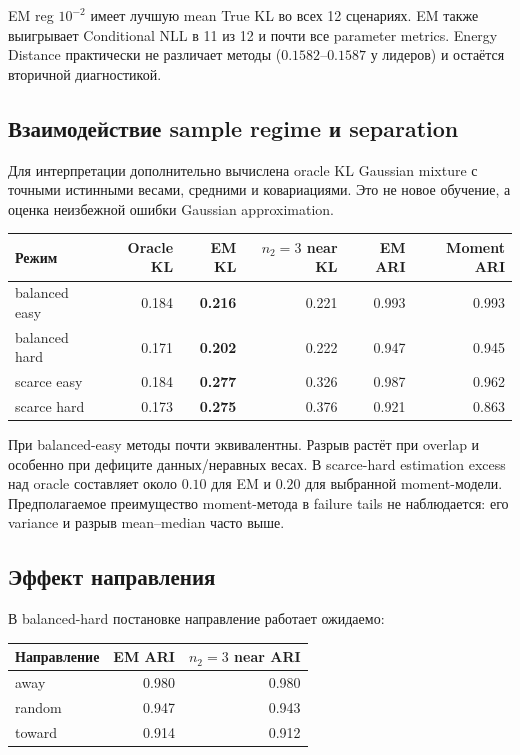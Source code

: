 \documentclass[11pt,a4paper]{article}
\newcommand{\best}[1]{\textbf{\color{green}#1}}
\begin{document}
EM reg $10^{-2}$ имеет лучшую mean True KL во всех 12 сценариях.
EM также выигрывает Conditional NLL в 11 из 12 и почти все parameter
metrics. Energy Distance практически не различает методы
($0.1582$--$0.1587$ у лидеров) и остаётся вторичной диагностикой.

\subsection{Взаимодействие sample regime и separation}

Для интерпретации дополнительно вычислена oracle KL Gaussian mixture с
точными истинными весами, средними и ковариациями. Это не новое обучение, а
оценка неизбежной ошибки Gaussian approximation.

\begin{center}
\small
\begin{tabular}{@{}lrrrrr@{}}
\toprule
\rowcolor{lightgray}
\textbf{Режим} & \textbf{Oracle KL} &
\textbf{EM KL} & \textbf{$n_2=3$ near KL} &
\textbf{EM ARI} & \textbf{Moment ARI}\\
\midrule
balanced easy & 0.184 & \best{0.216} & 0.221 & 0.993 & 0.993\\
balanced hard & 0.171 & \best{0.202} & 0.222 & 0.947 & 0.945\\
scarce easy   & 0.184 & \best{0.277} & 0.326 & 0.987 & 0.962\\
scarce hard   & 0.173 & \best{0.275} & 0.376 & 0.921 & 0.863\\
\bottomrule
\end{tabular}
\end{center}

При balanced-easy методы почти эквивалентны. Разрыв растёт при overlap и
особенно при дефиците данных/неравных весах. В scarce-hard estimation excess
над oracle составляет около $0.10$ для EM и $0.20$ для выбранной
moment-модели. Предполагаемое преимущество moment-метода в failure tails
не наблюдается: его variance и разрыв mean--median часто выше.

\subsection{Эффект направления}

В balanced-hard постановке направление работает ожидаемо:

\begin{center}
\small
\begin{tabular}{@{}lrr@{}}
\toprule
\rowcolor{lightgray}
\textbf{Направление} & \textbf{EM ARI} & \textbf{$n_2=3$ near ARI}\\
\midrule
away   & 0.980 & 0.980\\
random & 0.947 & 0.943\\
toward & 0.914 & 0.912\\
\bottomrule
\end{tabular}
\end{center}
\end{document}
